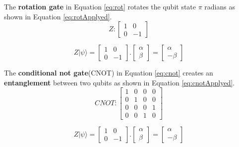 			\par The \textbf{rotation gate} in Equation \ref{eq:rot} rotates the qubit state $\pi$ radians as shown in Equation \ref{eq:rotApplyed}.
			\begin{equation}
				\label{eq:rot}
				Z : 
				\begin{bmatrix}
					1& 0 \\
					0& -1
				\end{bmatrix}
			\end{equation}
			
			\begin{equation}
				\label{eq:rotApplyed}
				Z|\psi\rangle = \begin{bmatrix}
					1& 0 \\
					0& -1
				\end{bmatrix} . \begin{bmatrix}
					\alpha \\
					\beta
				\end{bmatrix} = \begin{bmatrix}
					\alpha \\
					-\beta
				\end{bmatrix}
			\end{equation}

			\par The \textbf{conditional not gate}(CNOT) in Equation \ref{eq:cnot} creates an \textbf{entanglement} between two qubits as shown in Equation \ref{eq:cnotApplyed}.
			\begin{equation}
				\label{eq:cnot}
				CNOT : 
				\begin{bmatrix}
					1& 0& 0& 0 \\
					0& 1& 0& 0 \\
					0& 0& 0& 1 \\
					0& 0& 1& 0
				\end{bmatrix}
			\end{equation}
			
			\begin{equation}
				\label{eq:cnotApplyed}
				Z|\psi\rangle = \begin{bmatrix}
					1& 0 \\
					0& -1
				\end{bmatrix} . \begin{bmatrix}
					\alpha \\
					\beta
				\end{bmatrix} = \begin{bmatrix}
					\alpha \\
					-\beta
				\end{bmatrix}
			\end{equation}


